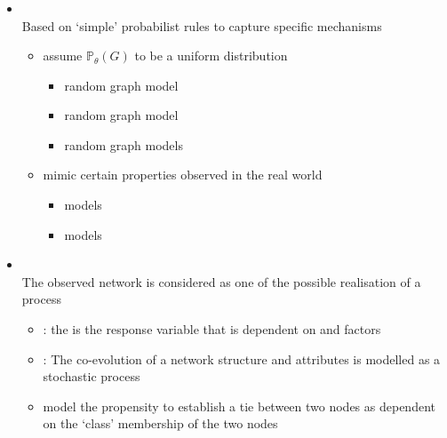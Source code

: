 \documentclass[8pt]{beamer}
\begin{document}
\begin{frame}
\frametitle{\insertsection}


    \begin{itemize}
    
    \item {\color{blue}{Mathematical models}}\\
    Based on `simple' probabilist rules to capture specific mechanisms
        	
    	\begin{itemize}
		\item  {\color{blue}{Random graph models}} assume $\mathbb{P}_{\theta}(G)$ to be a uniform distribution
			\begin{itemize}
			\item {\color{blue}{Erd\'os-R\'enyi}} random graph model
			\item {\color{blue}{Bernoulli}} random graph model
			\item {\color{blue}{Generalised}} random graph models
			\end{itemize}

		\item  {\color{blue}{Models based on mechanisms}} mimic certain properties observed in the real world
			\begin{itemize}
			\item {\color{blue}{Small-worlds}} models
			\item {\color{blue}{Preferential attachment}} models
			\end{itemize}
		\end{itemize}

\medskip

    \item {\color{blue}{Statistical models}}\\ 
     The observed network is considered as one of the possible realisation of a process
    
    	\begin{itemize}
		\item {\color{blue}{Exponential Random Graph Models (ERGM)}}: the {\color{blue}{presence/absence of a tie}} is the response variable that is dependent on {\color{blue}{endogenous}} and {\color{blue}{exogenous}} factors


		\item{\color{blue}{Stochastic Actor-Oriented Models (SAOM)}}: The co-evolution of a network structure and attributes is modelled as a stochastic process 

		\item {\color{blue}{Network Block Models}} model the propensity to establish a tie between two nodes as dependent on the `class' membership of the two nodes    	\end{itemize}

	\end{itemize}
	
\end{frame}
\end{document}
